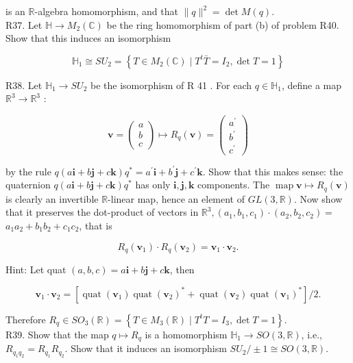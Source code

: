 is an $\mathbb{R}$-algebra homomorphism, and that $\|q\|^{2}=\operatorname{det} M(q)$.\\
R37. Let $\mathbb{H} \rightarrow M_{2}(\mathbb{C})$ be the ring homomorphism of part (b) of problem R40. Show that this induces an isomorphism

$$
\mathbb{H}_{1} \cong S U_{2}=\left\{T \in M_{2}(\mathbb{C}) \mid T^{t} \bar{T}=I_{2}, \operatorname{det} T=1\right\}
$$

R38. Let $\mathbb{H}_{1} \rightarrow S U_{2}$ be the isomorphism of R 41 . For each $q \in \mathbb{H}_{1}$, define a map $\mathbb{R}^{3} \rightarrow \mathbb{R}^{3}$ :

$$
\mathbf{v}=\left(\begin{array}{l}
	a \\
	b \\
	c
\end{array}\right) \mapsto R_{q}(\mathbf{v})=\left(\begin{array}{l}
	a^{\prime} \\
	b^{\prime} \\
	c^{\prime}
\end{array}\right)
$$

by the rule $q(a \mathbf{i}+b \mathbf{j}+c \mathbf{k}) q^{*}=a^{\prime} \mathbf{i}+b^{\prime} \mathbf{j}+c^{\prime} \mathbf{k}$. Show that this makes sense: the quaternion $q(a \mathbf{i}+b \mathbf{j}+c \mathbf{k}) q^{*}$ has only $\mathbf{i}, \mathbf{j}, \mathbf{k}$ components. The $\operatorname{map} \mathbf{v} \mapsto R_{q}(\mathbf{v})$ is clearly an invertible $\mathbb{R}$-linear map, hence an element of $G L(3, \mathbb{R})$. Now show that it preserves the dot-product of vectors in $\mathbb{R}^{3},\left(a_{1}, b_{1}, c_{1}\right) \cdot\left(a_{2}, b_{2}, c_{2}\right)=$ $a_{1} a_{2}+b_{1} b_{2}+c_{1} c_{2}$, that is

$$
R_{q}\left(\mathbf{v}_{1}\right) \cdot R_{q}\left(\mathbf{v}_{2}\right)=\mathbf{v}_{1} \cdot \mathbf{v}_{2} .
$$

Hint: Let quat $(a, b, c)=a \mathbf{i}+b \mathbf{j}+c \mathbf{k}$, then

$$
\mathbf{v}_{1} \cdot \mathbf{v}_{2}=\left[\operatorname{quat}\left(\mathbf{v}_{1}\right) \operatorname{quat}\left(\mathbf{v}_{2}\right)^{*}+\operatorname{quat}\left(\mathbf{v}_{2}\right) \operatorname{quat}\left(\mathbf{v}_{1}\right)^{*}\right] / 2 .
$$

Therefore $R_{q} \in S O_{3}(\mathbb{R})=\left\{T \in M_{3}(\mathbb{R}) \mid T^{t} T=I_{3}, \operatorname{det} T=1\right\}$.\\
R39. Show that the map $q \mapsto R_{q}$ is a homomorphism $\mathbb{H}_{1} \rightarrow S O(3, \mathbb{R})$, i.e., $R_{q_{1} q_{2}}=R_{q_{1}} R_{q_{2}}$. Show that it induces an isomorphism $S U_{2} / \pm 1 \cong S O(3, \mathbb{R})$.